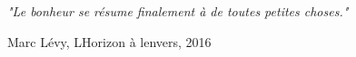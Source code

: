 \newpage
\begin{preface}
{
\itshape
"Le bonheur se résume finalement à de toutes petites choses."
}

Marc Lévy, L\textquotesingle Horizon à l\textquotesingle envers, 2016
\end{preface}
\newpage
\null
